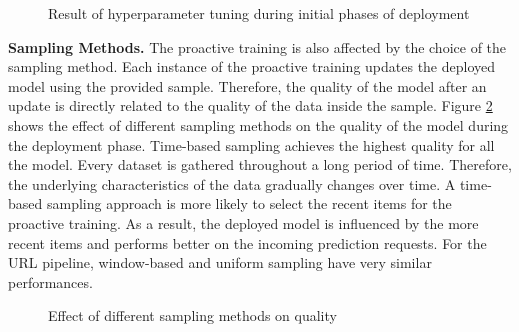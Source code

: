 \begin{figure}[!h]
\centering
\resizebox{\columnwidth}{!}{}
\caption{Result of hyperparameter tuning during initial phases of deployment}
\label{hyper-param-figure}
\end{figure}

\textbf{Sampling Methods.}
The proactive training is also affected by the choice of the sampling method.
Each instance of the proactive training updates the deployed model using the provided sample.
Therefore, the quality of the model after an update is directly related to the quality of the data inside the sample.
Figure \ref{sampling-method-figure} shows the effect of different sampling methods on the quality of the model during the deployment phase.
Time-based sampling achieves the highest quality for all the model.
Every dataset is gathered throughout a long period of time.
Therefore, the underlying characteristics of the data gradually changes over time.
A time-based sampling approach is more likely to select the recent items for the proactive training.
As a result, the deployed model is influenced by the more recent items and performs better on the incoming prediction requests.
For the URL pipeline, window-based and uniform sampling have very similar performances.

\begin{figure}[!h]
\centering
\resizebox{\columnwidth}{!}{}
\caption{Effect of different sampling methods on quality}
\label{sampling-method-figure}
\end{figure}

